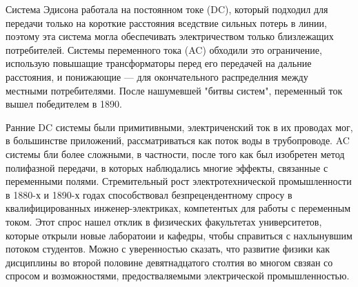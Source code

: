 \documentclass[12pt, oneside, a4paper]{article}
\begin{document}
Система Эдисона работала на постоянном токе (DC), который подходил для передачи только на короткие расстояния вседствие сильных потерь в линии, поэтому эта система могла обеспечивать электричеством только близлежащих потребителей. Системы переменного тока (AC) обходили это ограничение, использую повышащие трансформаторы перед его передачей на дальние расстояния, и понижающие --- для окончательного распределния между местными потребителями. После нашумевшей "битвы систем", переменный ток вышел победителем в 1890.

Ранние DC системы были примитивными, электриченский ток в их проводах мог, в большинстве приложений, рассматриваться как поток воды в трубопроводе. AC системы бли более сложными, в частности, после того как был изобретен метод полифазной передачи, в которых наблюдались многие эффекты, связанные с переменными полями. Стремительный рост электротехнической промышленности в 1880-х и 1890-х годах способствовал безпрецендентному спросу в квалифицированных инженер-электриках, компетентых для работы с  переменным током. Этот спрос нашел отклик в физических факультетах университетов, которые открыли новые лаборатоии и кафедры, чтобы справиться с нахлынувшим потоком студентов. Можно с уверенностью сказать, что развитие физики как дисциплины во второй половине девятнадцатого столтия во многом свзяан со спросом и возможностями, предостваляемыми электрической промышленностью. 
\end{document}
